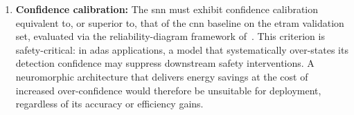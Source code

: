 \begin{enumerate}
    \item \textbf{Confidence calibration:}
    The \gls{snn} must exhibit confidence calibration equivalent to, or superior to, that of the \gls{cnn} baseline on the \gls{etram} validation set, evaluated via the reliability-diagram framework of~\textcite{guo2017calibration}.
    This criterion is safety-critical: in \gls{adas} applications, a model that systematically over-states its detection confidence may suppress downstream safety interventions.
    A neuromorphic architecture that delivers energy savings at the cost of increased over-confidence would therefore be unsuitable for deployment, regardless of its accuracy or efficiency gains.

\end{enumerate}